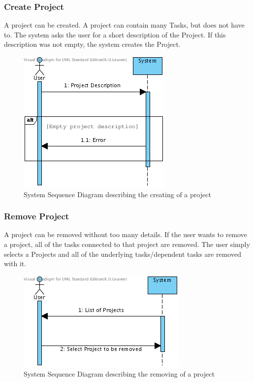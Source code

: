			\subsubsection{Create Project}
			A project can be created. A project can contain many Tasks, but does not have to. The system asks the user for a short description of the Project. If this description was not empty, the system creates the Project.
			\begin{figure}[H]
				\begin{center}
					\includegraphics[scale=0.5]{images/SSD_Create_Project.png}
				\end{center}
				\caption{System Sequence Diagram describing the creating of a project}
			\end{figure}
			\subsubsection{Remove Project}
			A project can be removed without too many details. If the user wants to remove a project, all of the tasks connected to that project are removed. The user simply selects a Projects and all of the underlying tasks/dependent tasks are removed with it.
			\begin{figure}[H]
				\begin{center}
					\includegraphics[scale=0.5]{images/SSD_Remove_Project.png}
				\end{center}
				\caption{System Sequence Diagram describing the removing of a project}
			\end{figure}
